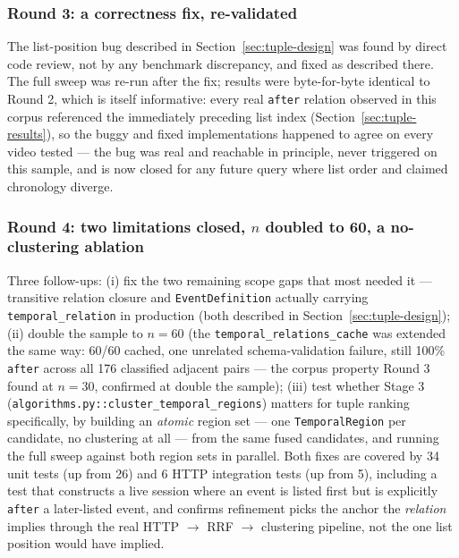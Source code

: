 \documentclass[11pt]{article}
\newcommand{\code}[1]{\texttt{\small #1}}
\newcommand{\file}[1]{\texttt{\footnotesize #1}}
\begin{document}
\subsubsection{Round 3: a correctness fix, re-validated}
\label{sec:tuple-round3}
The list-position bug described in Section~\ref{sec:tuple-design} was found
by direct code review, not by any benchmark discrepancy, and fixed as
described there. The full sweep was re-run after the fix; results were
byte-for-byte identical to Round 2, which is itself informative: every real
\code{after} relation observed in this corpus referenced the immediately
preceding list index (Section~\ref{sec:tuple-results}), so the buggy and
fixed implementations happened to agree on every video tested --- the bug
was real and reachable in principle, never triggered on this sample, and is
now closed for any future query where list order and claimed chronology
diverge.

\subsubsection{Round 4: two limitations closed, $n$ doubled to 60, a no-clustering ablation}
\label{sec:tuple-round4}
Three follow-ups: (i) fix the two remaining scope gaps that most needed it --- transitive relation
closure and \code{EventDefinition} actually carrying \code{temporal\_relation} in production
(both described in Section~\ref{sec:tuple-design}); (ii) double the sample to $n=60$ (the
\code{temporal\_relations\_cache} was extended the same way: 60/60 cached, one unrelated
schema-validation failure, still 100\% \code{after} across all 176 classified adjacent pairs ---
the corpus property Round 3 found at $n=30$, confirmed at double the sample); (iii) test whether
Stage 3 (\file{algorithms.py::cluster\_temporal\_regions}) matters for tuple ranking specifically,
by building an \emph{atomic} region set --- one \code{TemporalRegion} per candidate, no clustering
at all --- from the same fused candidates, and running the full sweep against both region sets in
parallel. Both fixes are covered by 34 unit tests (up from 26) and 6 HTTP integration tests (up
from 5), including a test that constructs a live session where an event is listed first but is
explicitly \code{after} a later-listed event, and confirms refinement picks the anchor the
\emph{relation} implies through the real HTTP $\to$ RRF $\to$ clustering pipeline, not the one list
position would have implied.
\end{document}
